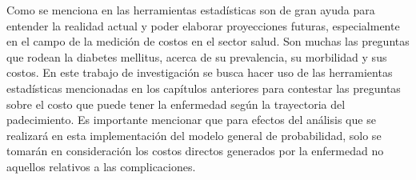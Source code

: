 Como se menciona en \cite{cichon1999modelling} las herramientas estad\'isticas son de gran ayuda para entender la realidad actual y poder elaborar proyecciones futuras, especialmente en el campo de la medici\'on de costos en el sector salud. Son muchas las preguntas que rodean la diabetes mellitus, acerca de su prevalencia, su morbilidad y sus costos. En este trabajo de investigaci\'on se busca hacer uso de las herramientas estad\'isticas mencionadas en los cap\'itulos anteriores para contestar las preguntas sobre el costo que puede tener la enfermedad seg\'un la trayectoria del padecimiento. Es importante mencionar que para efectos del an\'alisis que se realizar\'a en esta implementaci\'on del modelo general de probabilidad, solo se tomar\'an en consideraci\'on los costos directos generados por la enfermedad no aquellos relativos a las complicaciones. %
